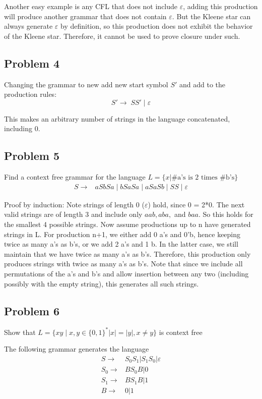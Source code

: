 \documentclass[english]{article}
\begin{document}
Another easy example is any CFL that does not include $\varepsilon$, adding this production will produce another grammar that does not contain $\varepsilon$. But the Kleene star can always generate $\varepsilon$ by definition, so this production does not exhibit the behavior of the Kleene star. Therefore, it cannot be used to prove closure under such.

\subsection*{Problem 4}
Changing the grammar to new add new start symbol $S'$ and add to the production rules:
\[ S' \rightarrow \; SS' \; | \; \varepsilon \]

This makes an arbitrary number of strings in the language concatenated, including 0.

\subsection*{Problem 5}
Find a context free grammar for the language \(L = \{ x | \textrm{\#a's is 2 times \#b's}\}\)
\begin{align*}
S \rightarrow & aSbSa \;|\; bSaSa \;|\; aSaSb \;|\; SS \;|\; \varepsilon
\end{align*}

Proof by induction: Note strings of length 0 ($\varepsilon$) hold, since 0 = 2*0. The next valid strings are of length 3 and include only $aab, aba,$ and $baa$. So this holds for the smallest 4 possible strings. Now assume productions up to n have generated strings in L. For production n+1, we either add 0 a's and 0'b, hence keeping twice as many a's as b's, or we add 2 a's and 1 b. In the latter case, we still maintain that we have twice as many a's as b's. Therefore, this production only produces strings with twice as many a's as b's. Note that since we include all permutations of the a's and b's and allow insertion between any two (including possibly with the empty string), this generates all such strings.

\subsection*{Problem 6}
Show that \(L = \{ xy \mid x,y \in \{0,1\}^* |x| = |y|, x \neq y \}\) is context free

The following grammar generates the language
\begin{align*}
S \rightarrow & S_0 S_1 | S_1 S_0 | \varepsilon \\
S_0 \rightarrow & B S_0 B | 0 \\
S_1 \rightarrow & B S_1 B | 1 \\
B \rightarrow & 0 | 1
\end{align*}
\end{document}
